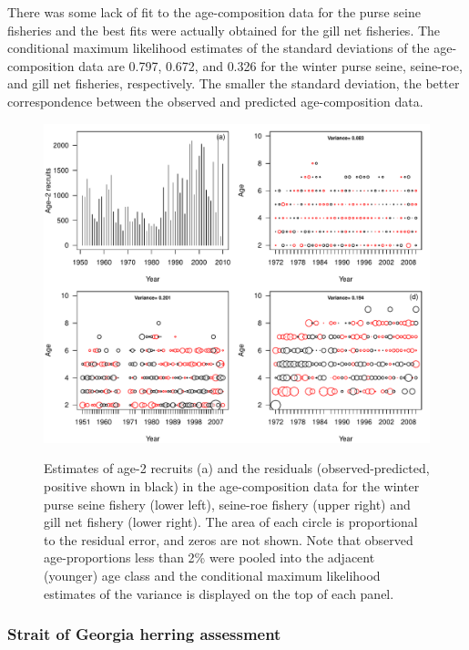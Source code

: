 There was some lack of fit to the age-composition data for the purse seine fisheries and the best fits were actually obtained for the gill net fisheries. The conditional maximum likelihood estimates of the standard deviations of the age-composition data are 0.797, 0.672, and 0.326 for the winter purse seine, seine-roe, and gill net fisheries, respectively.  The smaller the standard deviation, the better correspondence between the observed and predicted age-composition data.

\begin{figure}[!tbp]
	\includegraphics[width=\textwidth]{Figs/fig3_HCAM_ctrl.pdf}\\
	\caption{Estimates of age-2 recruits (a) and the residuals (observed-predicted, positive shown in black)  in the age-composition data for the winter purse seine fishery (lower left), seine-roe fishery (upper right) and gill net fishery (lower right). The area of each circle is proportional to the residual error, and zeros are not shown. Note that observed age-proportions less than 2\% were pooled into the adjacent (younger) age class and the conditional maximum likelihood estimates of the variance is displayed on the top of each panel.}\label{fig3_HCAM_ctrl}
\end{figure}

		\subsubsection{Strait of Georgia herring assessment}
